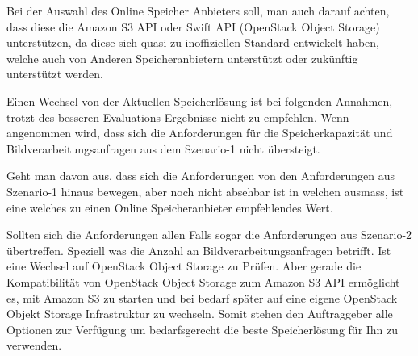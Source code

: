 Bei der Auswahl des Online Speicher Anbieters soll, man auch darauf achten, dass diese die Amazon S3 API oder Swift API (OpenStack Object Storage) unterstützen, da diese sich quasi zu inoffiziellen Standard entwickelt haben, welche auch von Anderen Speicheranbietern unterstützt oder zukünftig unterstützt werden.
 
Einen Wechsel von der Aktuellen Speicherlösung ist bei folgenden Annahmen, trotzt des besseren Evaluations-Ergebnisse nicht zu empfehlen. Wenn angenommen wird, dass sich die Anforderungen für die Speicherkapazität und Bildverarbeitungsanfragen aus dem Szenario-1 nicht übersteigt.

Geht man davon aus, dass sich die Anforderungen von den Anforderungen aus Szenario-1 hinaus bewegen, aber noch nicht absehbar ist in welchen ausmass, ist eine welches zu einen Online Speicheranbieter empfehlendes Wert.

Sollten sich die Anforderungen allen Falls sogar die Anforderungen aus Szenario-2 übertreffen. Speziell was die Anzahl an Bildverarbeitungsanfragen betrifft. Ist eine Wechsel auf OpenStack Object Storage zu Prüfen. Aber gerade die Kompatibilität von OpenStack Object Storage zum Amazon S3 API ermöglicht es, mit Amazon S3 zu starten und bei bedarf später auf eine eigene OpenStack Objekt Storage Infrastruktur zu wechseln. Somit stehen den Auftraggeber alle Optionen zur Verfügung um bedarfsgerecht die beste Speicherlösung für Ihn zu verwenden.

